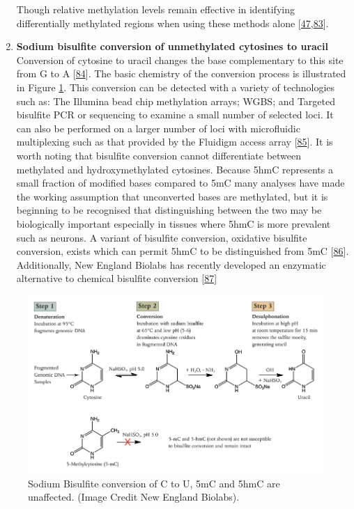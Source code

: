 \documentclass[
]{book}
\begin{document}
\begin{enumerate}
  Though relative methylation levels remain effective in identifying differentially methylated regions when using these methods alone {[}\protect\hyperlink{ref-Maunakea2010}{47},\protect\hyperlink{ref-Bock2010}{83}{]}.
\item
  \textbf{Sodium bisulfite conversion of unmethylated cytosines to uracil}
  Conversion of cytosine to uracil changes the base complementary to this site from G to A {[}\protect\hyperlink{ref-Hayatsu1970}{84}{]}.
  The basic chemistry of the conversion process is illustrated in Figure \ref{fig:BisulfiteConversionNEB}.
  This conversion can be detected with a variety of technologies such as:
  The Illumina bead chip methylation arrays; WGBS; and Targeted bisulfite PCR or sequencing to examine a small number of selected loci.
  It can also be performed on a larger number of loci with microfluidic multiplexing such as that provided by the Fluidigm access array {[}\protect\hyperlink{ref-Adamowicz2018}{85}{]}.
  It is worth noting that bisulfite conversion cannot differentiate between methylated and hydroxymethylated cytosines.
  Because 5hmC represents a small fraction of modified bases compared to 5mC many analyses have made the working assumption that unconverted bases are methylated, but it is beginning to be recognised that distinguishing between the two may be biologically important especially in tissues where 5hmC is more prevalent such as neurons.
  A variant of bisulfite conversion, oxidative bisulfite conversion, exists which can permit 5hmC to be distinguished from 5mC {[}\protect\hyperlink{ref-Skvortsova2017}{86}{]}.
  Additionally, New England Biolabs has recently developed an enzymatic alternative to chemical bisulfite conversion {[}\protect\hyperlink{ref-Williams2019}{87}{]}
\end{enumerate}

\begin{figure}

{\centering \includegraphics[width=0.8\linewidth]{figs/BisulfiteConversionNEB} 

}

\caption{Sodium Bisulfite conversion of C to U, 5mC and 5hmC are unaffected. (Image Credit New England Biolabs).}\label{fig:BisulfiteConversionNEB}
\end{figure}
\end{document}
